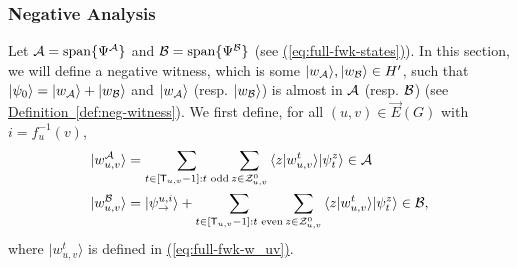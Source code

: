 \documentclass{theoretics}
\newcommand{\eq}[1]{\hyperref[eq:#1]{(\ref*{eq:#1})}}
\newcommand{\defin}[1]{\hyperref[def:#1]{Definition~\ref*{def:#1}}}
\def\ket#1{{\lvert}#1\rangle}
\renewcommand{\>}{\rangle}
\newcommand{\<}{\langle}
\renewcommand{\(}{\left(}
\renewcommand{\)}{\right)}
\def\braket#1#2{{{\langle}#1\vert}#2\rangle}
\begin{document}
\subsubsection{Negative Analysis} 

Let ${\cal A}=\mathrm{span}\{\Psi^{\cal A}\}$ and ${\cal B}=\mathrm{span}\{\Psi^{\cal B}\}$ (see \eq{full-fwk-states}).
In this section, we will define a negative witness, which is some $\ket{w_{\cal A}},\ket{w_{\cal B}}\in H'$, such that $\ket{\psi_0}=\ket{w_{\cal A}}+\ket{w_{\cal B}}$ and $\ket{w_{\cal A}}$ (resp. $\ket{w_{\cal B}}$) is almost in ${\cal A}$ (resp. ${\cal B}$) (see \defin{neg-witness}). 
We first define, for all $(u,v)\in\overrightarrow{E}(G)$ with $i=f_u^{-1}(v)$, 
\begin{equation}
\begin{split}
\ket{w_{u,v}^{\cal A}} &= \sum_{t\in [{\sf T}_{u,v}-1]:t\text{ odd}}\sum_{z\in {\cal Z}_{u,v}^0}\braket{z}{w_{u,v}^t}\ket{\psi_t^{z}}\in{\cal A}\\
\ket{w_{u,v}^{\cal B}} &= \ket{\psi_{\rightarrow}^{u,i}}+\sum_{t\in [{\sf T}_{u,v}-1]:t\text{ even}}\sum_{z\in {\cal Z}_{u,v}^0}\braket{z}{w_{u,v}^t}\ket{\psi_t^{z}}\in{\cal B},
\end{split}\label{eq:w_uv-AB}
\end{equation}
where $\ket{w_{u,v}^t}$ is defined in \eq{full-fwk-w_uv}.
\end{document}
